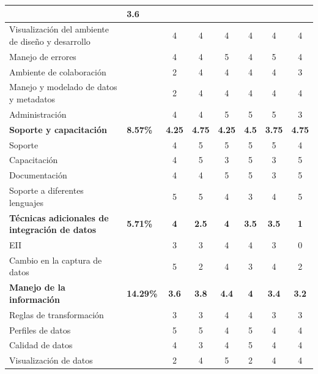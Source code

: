 \documentclass[a4paper,openright,12pt]{book}
\begin{document}
\begin{table}[htbp]
\begin{center}
{\begin{tabular}{|p{5.5cm}|>{\centering\arraybackslash}m{1.7cm}|c|c|c|c|c|c|}
        & \textbf{3.6} \\
        \hline
        Visualización del ambiente de diseño y desarrollo
        & & 4 & 4 & 4 & 4 & 4 & 4 \\
        \hline
        Manejo de errores & & 4 & 4 & 5 & 4 & 5 & 4\\
        \hline
        Ambiente de colaboración & & 2 & 4 & 4 & 4 & 4 & 3\\
        \hline
        Manejo y modelado de datos y metadatos & & 2 & 4 & 4 & 4 & 4 & 4 \\
        \hline
        Administración & & 4 & 4 & 5 & 5 & 5 & 3\\
        \hline
        \rowcolor[gray]{0.9}\textbf{Soporte y capacitación}
        & \textbf{8.57\%}
        & \textbf{4.25}
        & \textbf{4.75}
        & \textbf{4.25}
        & \textbf{4.5}
        & \textbf{3.75}
        & \textbf{4.75}\\
        \hline
        Soporte & & 4 & 5 & 5 & 5 & 5 & 4 \\
        \hline
        Capacitación & & 4 & 5 & 3 & 5 & 3 & 5 \\
        \hline
        Documentación & & 4 & 4 & 5 & 5 & 3 & 5 \\
        \hline
        Soporte a diferentes lenguajes & & 5 & 5 & 4 & 3 & 4 & 5 \\
        \hline
        \rowcolor[gray]{0.9}\textbf{Técnicas adicionales de integración de
        datos}
        & \textbf{5.71\%}
        &\textbf{ 4}
        & \textbf{2.5}
        & \textbf{4}
        & \textbf{3.5}
        & \textbf{3.5} & \textbf{1} \\
        \hline
        EII & & 3 & 3 & 4 & 4 & 3 & 0 \\
        \hline
        Cambio en la captura de datos & & 5 & 2 & 4 & 3 & 4 & 2 \\
        \hline
        \rowcolor[gray]{0.9}\textbf{Manejo de la información}
        & \textbf{14.29\%}
        & \textbf{3.6}
        & \textbf{3.8}
        & \textbf{4.4}
        & \textbf{4}
        & \textbf{3.4}
        & \textbf{3.2} \\
        \hline
        Reglas de transformación & & 3 & 3 & 4 & 4 & 3 & 3 \\
        \hline
        Perfiles de datos & & 5 & 5 & 4 & 5 & 4 & 4 \\
        \hline
        Calidad de datos & & 4 & 3 & 4 & 5 & 4 & 4 \\
        \hline
        Visualización de datos & & 2 & 4 & 5 & 2 & 4 & 4 \\

\end{tabular}}
\end{center}
\end{table}
\end{document}

